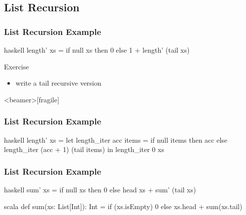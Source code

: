 \documentclass[dvipsnames]{beamer}
\theoremstyle{plain}
\begin{document}
\subsection{List Recursion}

\begin{frame}[fragile]
  \frametitle{List Recursion Example}

  \begin{example}
    \begin{pygments}{haskell}
length' xs =
    if null xs
    then 0
    else 1 + length' (tail xs)
    \end{pygments}
  \end{example}

  \pause
  \begin{block}{Exercise}
    \begin{itemize}
      \item write a tail recursive version
    \end{itemize}
  \end{block}
\end{frame}

\begin{frame}<beamer>[fragile]
  \frametitle{List Recursion Example}

  \begin{example}
    \begin{pygments}{haskell}
length' xs =
    let
        length_iter acc items =
            if null items
            then acc
            else length_iter (acc + 1) (tail items)
    in
        length_iter 0 xs
    \end{pygments}
  \end{example}
\end{frame}

\begin{frame}[fragile]
  \frametitle{List Recursion Example}
  \begin{example}
    \pause
    \begin{pygments}{haskell}
sum' xs =
    if null xs
    then 0
    else head xs + sum' (tail xs)
    \end{pygments}
  \end{example}

  \pause
  \begin{example}[Scala]
    \begin{pygments}{scala}
def sum(xs: List[Int]): Int =
    if (xs.isEmpty) 0
    else xs.head + sum(xs.tail)
    \end{pygments}
  \end{example}
\end{frame}
\end{document}
